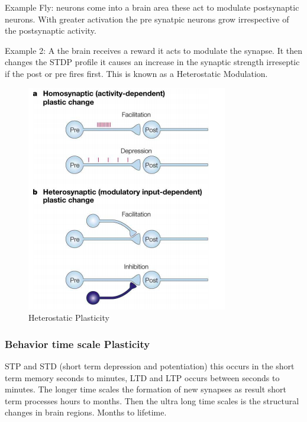 \documentclass[main]{subfiles}
\begin{document}
Example Fly: neurons come into a brain area these act to modulate postsynaptic neurons. With greater activation the pre synatpic neurons grow irrespective of the postsynaptic activity.

Example 2: A the brain receives a reward it acts to modulate the synapse. It then changes the STDP profile it causes an increase in the synaptic strength irreseptic if the post or pre fires first. This is known as a Heterostatic Modulation.


\begin{figure}[H]
    \centering
    \includegraphics[width=.8\textwidth]{03_PlasticityInTheBrain/figures/pasted_image_8.png}
    \caption{Heterostatic Plasticity}
    \label{fig:syn_plas1t}
\end{figure}





\subsubsection{Behavior time scale Plasticity}

STP and STD (short term depression and potentiation) this occurs in the short term memory seconds to minutes, LTD and LTP occurs between seconds to minutes. 
The longer time scales the formation of new synapses as result short term processes hours to months. 
Then the ultra long time scales is the structural changes in brain regions. Months to lifetime.
\end{document}
